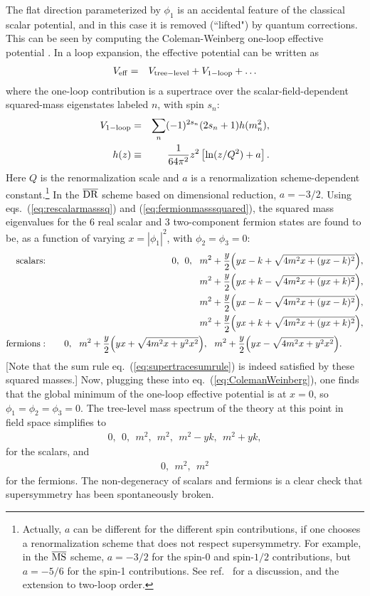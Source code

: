 \documentclass[12pt]{article}
\def\beq{\begin{eqnarray}}
\def\eeq{\end{eqnarray}}
\def\drbar{\overline{\rm DR}}
\def\msbar{\overline{\rm MS}}
\begin{document}
The flat direction parameterized by $\phi_1$ is an accidental feature of
the classical scalar potential, and in this case it is removed (``lifted")
by quantum corrections. This can be seen by computing the Coleman-Weinberg
one-loop effective potential \cite{ColemanWeinberg}. In a loop expansion,
the effective potential can be written as
\beq
V_{\rm eff} &=& V_{\rm tree-level} + V_{\rm 1-loop} + \ldots
\label{eq:Veffexp}
\eeq
where the one-loop contribution is a supertrace over the
scalar-field-dependent squared-mass eigenstates labeled $n$, with spin $s_n$:
\beq
V_{\rm 1-loop} &=& \sum_n (-1)^{2 s_n} (2 s_n + 1) h(m_n^2),
\\
h(z) &\equiv& \frac{1}{64 \pi^2} z^2 \left [\ln(z/Q^2) + a \right].
\label{eq:ColemanWeinberg}
\eeq
Here $Q$ is the renormalization scale and 
$a$ is a renormalization scheme-dependent constant.\footnote{Actually, $a$ can be 
different for the different spin contributions, if one chooses a renormalization 
scheme that does not respect 
supersymmetry. For example, in 
the $\msbar$ scheme, $a = -3/2$ for the spin-0 and spin-$1/2$ contributions, 
but $a = -5/6$ for 
the spin-1 contributions. See ref.~\cite{twoloopEP} 
for a discussion, and the extension to two-loop order.}  
In the $\drbar$ scheme based on dimensional reduction, $a=-3/2$.
Using eqs.~(\ref{eq:rescalarmasssq}) and
(\ref{eq:fermionmasssquared}), the squared mass eigenvalues for the 6 real scalar and 
3 two-component fermion 
states are found to be, as a function of varying $x = |\phi_1|^2$, with $\phi_2=\phi_3=0$:
\beq
\mbox{scalars:}
\quad&&
0
,\>\>
0
,\>\>\> 
m^2 + \frac{y}{2} \Bigl (y x - k + \sqrt{4 m^2 x + (y x - k)^2} \Bigr ),
\nonumber
\\
&& m^2 + \frac{y}{2} \Bigl (y x + k - \sqrt{4 m^2 x + (y x + k)^2} \Bigr ),
\nonumber
\\
&& m^2 + \frac{y}{2} \Bigl (y x - k - \sqrt{4 m^2 x + (y x - k)^2} \Bigr ),
\nonumber
\\ 
&&
m^2 + \frac{y}{2} \Bigl (y x + k + \sqrt{4 m^2 x + (y x + k)^2} \Bigr ),
\\
\mbox{fermions}:\quad&&
0
,\>\>\>
m^2 + \frac{y}{2} \Bigl (y x + \sqrt{4 m^2 x + y^2 x^2} \Bigr )
,\>\>\>
m^2 + \frac{y}{2} \Bigl (y x - \sqrt{4 m^2 x + y^2 x^2} \Bigr ).\phantom{xxxx}
\eeq
[Note that the sum rule
eq.~(\ref{eq:supertracesumrule}) is indeed satisfied by these squared
masses.] 
Now, plugging these into eq.~(\ref{eq:ColemanWeinberg}), one finds that the global minimum of the 
one-loop 
effective potential is at $x=0$, so $\phi_1 = \phi_2 = \phi_3 = 0$. 
The tree-level mass
spectrum of the theory at this point in field space simplifies to
\beq
0,\>\> 0,\>\> m^2,\>\> m^2,\>\> m^2 - yk,\>\> m^2 + yk ,
\label{ORscalars}
\eeq
for the scalars, and
\beq
0,\>\> m^2,\>\> m^2
\label{ORfermions}
\eeq
for the fermions.
The non-degeneracy of scalars and fermions is a clear check that
supersymmetry has been spontaneously broken. 
\end{document}
